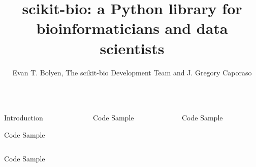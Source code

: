 \documentclass[final,t]{beamer}
\title{\huge scikit-bio: a Python library for bioinformaticians and data scientists}
\author{Evan T. Bolyen, The scikit-bio Development Team and J. Gregory Caporaso}
\institute{Affiliations go here}
\begin{document}
\begin{frame}{}
  \begin{columns}[t]
    \begin{column}{.3\linewidth}


      \begin{block}{Introduction}
          \lipsum[1]
          \lipsum[2]
      \end{block}


      \begin{block}{Code Sample}
        \inputminted{python}{assets/py/convert_fastq.py}
      \end{block}


      \begin{block}{Code Sample}
        \inputminted{python}{assets/py/convert_fastq.py}
      \end{block}

    \end{column}
    \begin{column}{.3\linewidth}

        \begin{block}{Code Sample}
          \inputminted{python}{assets/py/convert_fastq.py}
        \end{block}

    \end{column}


    \begin{column}{.3\linewidth}


        \begin{block}{Code Sample}
          \inputminted{python}{assets/py/convert_fastq.py}
        \end{block}

    \end{column}
  \end{columns}
\end{frame}
\end{document}
